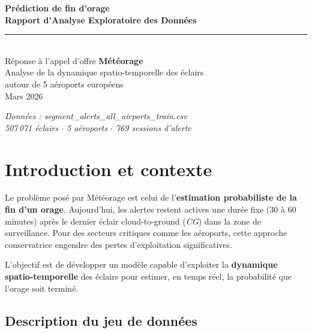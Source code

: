 \documentclass[11pt,a4paper]{article}
\begin{document}
\begin{titlepage}
  \pagecolor{meteoBlue}
  \color{white}
  \vspace*{2cm}
  \begin{center}
    {\Huge\bfseries Prédiction de fin d'orage\\[0.4em]}
    {\large\bfseries Rapport d'Analyse Exploratoire des Données}\\[2em]
    \rule{0.5\linewidth}{0.8pt}\\[1.5em]
    {\large Réponse à l'appel d'offre \textbf{Météorage}}\\[0.5em]
    {\normalsize Analyse de la dynamique spatio-temporelle des éclairs\\
    autour de 5 aéroports européens}\\[3em]
    {\normalsize Mars 2026}
  \end{center}
  \vfill
  \begin{center}
    \small\textit{Données : segment\_alerts\_all\_airports\_train.csv}\\
    \small\textit{507\,071 éclairs $\cdot$ 5 aéroports $\cdot$ 769 sessions d'alerte}
  \end{center}
\end{titlepage}
\nopagecolor

\tableofcontents
\newpage

\section{Introduction et contexte}

Le problème posé par Météorage est celui de l'\textbf{estimation probabiliste de la fin d'un orage}. 
Aujourd'hui, les alertes restent actives une durée fixe (30 à 60 minutes) après le dernier éclair 
cloud-to-ground (\textit{CG}) dans la zone de surveillance. Pour des secteurs critiques comme les aéroports, 
cette approche conservatrice engendre des pertes d'exploitation significatives.

L'objectif est de développer un modèle capable d'exploiter la \textbf{dynamique spatio-temporelle} 
des éclairs pour estimer, en temps réel, la probabilité que l'orage soit terminé.

\subsection{Description du jeu de données}
\end{document}
